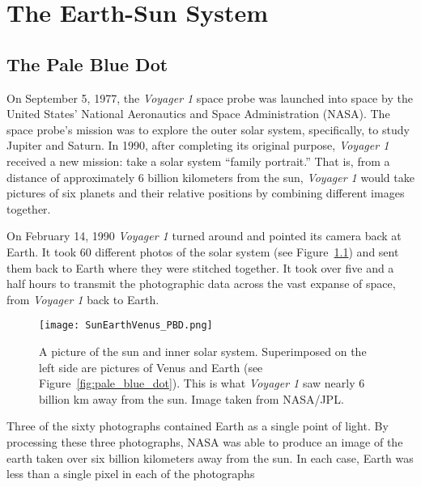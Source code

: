 
\chapter{\label{ch:earth_sun}The Earth-Sun System} 

\section{\label{sec:pbd}The Pale Blue Dot}

On September 5, 1977, the \emph{Voyager 1} space probe was launched into space by the United States' National Aeronautics and Space Administration (NASA). The space probe's mission was to explore the outer solar system, specifically, to study Jupiter and Saturn. In 1990, after completing its original purpose,  \emph{Voyager 1} received a new mission: take a solar system ``family portrait.'' That is, from a distance of approximately 6 billion kilometers from the sun, \emph{Voyager 1} would take pictures of six planets and their relative positions by combining different images together.

On February 14, 1990  \emph{Voyager 1} turned around and pointed its camera back at Earth. It took 60 different photos of the solar system (see Figure~\ref{fig:EarthSunVenus}) and sent them back to Earth where they were stitched together. It took over five and a half hours to transmit the photographic data across the vast expanse of space, from \emph{Voyager 1} back to Earth. 

    \begin{figure}[ht]
    \centering
		\texttt{[image: SunEarthVenus\_PBD.png]}
		\caption{A picture of the sun and inner solar system. Superimposed on the left side are pictures of Venus and Earth (see Figure~\ref{fig:pale_blue_dot}). This is what \emph{Voyager 1} saw nearly 6 billion \si{\km} away from the sun. Image taken from NASA/JPL.}
        \label{fig:EarthSunVenus}
    \end{figure}

Three of the sixty photographs contained Earth as a single point of light. By processing these three photographs, NASA was able to produce an image of the earth taken over six billion kilometers away from the sun. In each case, Earth was less than a single pixel in each of the photographs %

